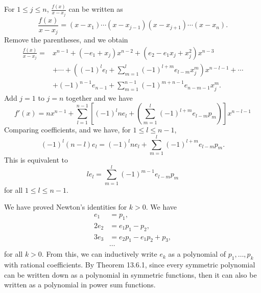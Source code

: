 \documentclass[a4paper, 12pt]{article}
\begin{document}
\begin{solution}
\begin{enumerate}[(a)]
For \(1\leq j\leq n\), \(\frac{f(x)}{x-x_j}\) can be written as 
\[\frac{f(x)}{x-x_j}=(x-x_1)\cdots (x-x_{j-1})(x-x_{j+1})\cdots(x-x_n).\]
Remove the parentheses, and we obtain 
\begin{align*}
    \frac{f(x)}{x-x_j}=&x^{n-1}+(-e_1+x_j)x^{n-2}+(e_2-e_1x_j+x_j^2)x^{n-3}\\
                       &+\cdots+((-1)^l e_l+\sum_{m=1}^{l} (-1)^{l+m}e_{l-m}x_j^{m})x^{n-l-1}+\cdots\\
                       &+(-1)^{n-1}e_{n-1}+\sum_{m=1}^{n-1} (-1)^{m+n-1}e_{n-m-1}x_j^{m}.
\end{align*}
Add \(j=1\) to \(j=n\) together and we have 
\[f'(x)=nx^{n-1}+\sum_{l=1}^{n-1}[(-1)^l n e_l+(\sum_{m=1}^{l}(-1)^{l+m}e_{l-m}p_m)]x^{n-l-1}\]
Comparing coefficients, and we have, for \(1\leq l\leq n-1\), 
\[(-1)^l (n-l)e_l=(-1)^l n e_l+\sum_{m=1}^{l} (-1)^{l+m} e_{l-m}p_m.\]
This is equivalent to 
\[l e_l=\sum_{m=1}^{l}(-1)^{m-1} e_{l-m}p_m\]
for all \(1\leq l\leq n-1\).
\end{enumerate}

We have proved Newton's identities for \(k>0\). We have 
\begin{align*}
    e_1&=p_1,\\
    2e_2&=e_1p_1-p_2,\\
    3e_3&=e_2p_1-e_1p_2+p_3,\\ 
    &\cdots 
\end{align*}
for all \(k>0\). From this, we can inductively write \(e_k\) as a polynomial of \(p_1,\ldots,p_k\) with rational coefficients. By Theorem 13.6.1, since every symmetric polynomial can be written down as a polynomial in symmetric functions, then it can also be written as a polynomial in power sum functions. 
\end{solution}
\end{document}
